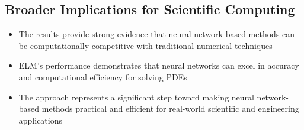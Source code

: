 \documentclass[11pt,a4paper]{article}
\begin{document}
\subsection{Broader Implications for Scientific Computing}

\begin{itemize}
    \item The results provide strong evidence that neural network-based methods can be computationally competitive with traditional numerical techniques
    \item ELM's performance demonstrates that neural networks can excel in accuracy and computational efficiency for solving PDEs
    \item The approach represents a significant step toward making neural network-based methods practical and efficient for real-world scientific and engineering applications
\end{itemize}
\end{document}

